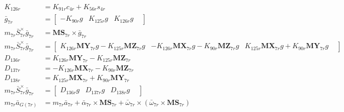 \begin{align}
K_{126r} &= K_{91r}c_{4r} + K_{56r}s_{4r} \nonumber \\
 \bar{g}_{7r} &= \left[\begin{matrix} -K_{90r}g & K_{125r}g & K_{126r}g &  \end{matrix}\right] 
 \nonumber \\ 
 m_{7r}\bar{S}_{7r}^{\times}\bar{g}_{7r} &= \mathbf{MS}_{7r} \times \bar{g}_{7r} 
 \nonumber \\ 
 m_{7r}\bar{S}_{7r}^{\times}\bar{g}_{7r} &= \left[\begin{matrix} K_{126r}\mathbf{MY}_{7r}g - K_{125r}\mathbf{MZ}_{7r}g & - K_{126r}\mathbf{MX}_{7r}g - K_{90r}\mathbf{MZ}_{7r}g & K_{125r}\mathbf{MX}_{7r}g + K_{90r}\mathbf{MY}_{7r}g &  \end{matrix}\right] 
 \nonumber \\ 
D_{136r} &= K_{126r}\mathbf{MY}_{7r} - K_{125r}\mathbf{MZ}_{7r} \nonumber \\
D_{137r} &= - K_{126r}\mathbf{MX}_{7r} - K_{90r}\mathbf{MZ}_{7r} \nonumber \\
D_{138r} &= K_{125r}\mathbf{MX}_{7r} + K_{90r}\mathbf{MY}_{7r} \nonumber \\
 m_{7r}\bar{S}_{7r}^{\times}\bar{g}_{7r} &= \left[\begin{matrix} D_{136r}g & D_{137r}g & D_{138r}g &  \end{matrix}\right] 
 \nonumber \\ 
 m_{7r}\bar{a}_{G(7r)} &= m_{7r}\bar{a}_{7r} + \bar\alpha_{7r} \times \mathbf{MS}_{7r} + \bar\omega_{7r} \times \left(\bar\omega_{7r} \times \mathbf{MS}_{7r}\right) 
 \nonumber \\ 

\end{align}

